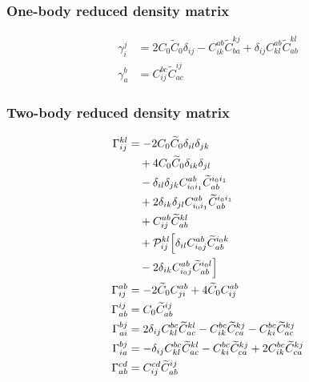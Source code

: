 \subsubsection{One-body reduced density matrix}
\begin{align*}
\gamma^{j}_{i} &= 2 C_{0} \widetilde{C}_{0} \delta_{i j}  - C^{ab}_{ik}  \widetilde{C}^{kj}_{ba}   + \delta_{i j} C^{ab}_{kl}  \widetilde{C}^{kl}_{ab} \\
\gamma^{b}_{a} &= C^{bc}_{ij}  \widetilde{C}^{ij}_{ac}
\end{align*}

\subsubsection{Two-body reduced density matrix}
\begin{align*}
\Gamma^{kl}_{ij} &= -  2 C_{0} \widetilde{C}_{0} \delta_{i l} \delta_{j k}  \\
  &\quad  + 4 C_{0} \widetilde{C}_{0} \delta_{i k} \delta_{j l}  \\
  &\quad -  \delta_{i l} \delta_{j k} C^{ab}_{i_{0}i_{1}}  \widetilde{C}^{i_{0}i_{1}}_{ab}  \\
  &\quad  + 2 \delta_{i k} \delta_{j l} C^{ab}_{i_{0}i_{1}}  \widetilde{C}^{i_{0}i_{1}}_{ab}  \\
  &\quad  + C^{ab}_{ij}  \widetilde{C}^{kl}_{ab} \\
  &\quad + \mathcal{P}^{kl}_{ij}\Bigl[ \delta_{i l} C^{ab}_{i_{0}j}  \widetilde{C}^{i_{0}k}_{ab}  \\
  &\quad -  2 \delta_{i k} C^{ab}_{i_{0}j}  \widetilde{C}^{i_{0}l}_{ab} \Bigr] \\
\Gamma^{ab}_{ij} &= -  2 \widetilde{C}_{0} C^{ab}_{ji}   + 4 \widetilde{C}_{0} C^{ab}_{ij} \\
\Gamma^{ij}_{ab} &= C_{0} \widetilde{C}^{ij}_{ab} \\
\Gamma^{bj}_{ai} &= 2 \delta_{i j} C^{bc}_{kl}  \widetilde{C}^{kl}_{ac}  - C^{bc}_{ik}  \widetilde{C}^{kj}_{ca}  - C^{bc}_{ki}  \widetilde{C}^{kj}_{ac} \\
\Gamma^{bj}_{ia} &= -  \delta_{i j} C^{bc}_{kl}  \widetilde{C}^{kl}_{ac}  - C^{bc}_{ki}  \widetilde{C}^{kj}_{ca}   + 2 C^{bc}_{ik}  \widetilde{C}^{kj}_{ca} \\
\Gamma^{cd}_{ab} &= C^{cd}_{ij}  \widetilde{C}^{ij}_{ab}
\end{align*}
